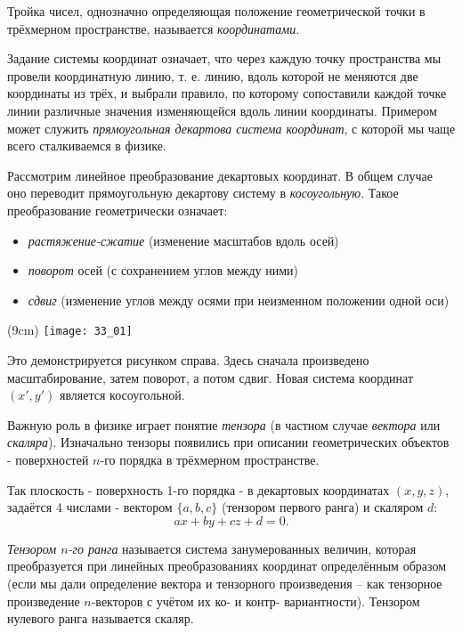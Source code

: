 
Тройка чисел, однозначно определяющая положение геометрической точки в
трёхмерном пространстве, называется \emph{координатами}. 

Задание системы координат означает, что через каждую точку пространства мы
провели координатную линию, т. е. линию, вдоль которой не меняются две
координаты из трёх, и выбрали правило, по которому сопоставили каждой точке
линии различные значения изменяющейся вдоль линии координаты. Примером может
служить \emph{прямоугольная декартова система координат}, с которой мы чаще
всего сталкиваемся в физике.

Рассмотрим линейное преобразование декартовых координат. В общем случае оно
переводит прямоугольную декартову систему в \emph{косоугольную}. Такое
преобразование геометрически означает:
    \begin{itemize}
        \item \emph{растяжение-сжатие} (изменение масштабов вдоль осей)
        \item \emph{поворот} осей (с сохранением углов между ними)
        \item \emph{сдвиг} (изменение углов между осями при неизменном
            положении одной оси)
    \end{itemize}
    
\sidefig(9cm)
{\texttt{[image: 33\_01]}}{Это демонстрируется рисунком справа.
Здесь сначала произведено масштабирование, затем поворот, а потом сдвиг. Новая
система координат \( (x', y') \) является косоугольной.

Важную роль в физике играет понятие \emph{тензора} (в частном случае
\emph{вектора} или \emph{скаляра}). Изначально тензоры появились при описании
геометрических объектов - поверхностей \( n \)-го порядка в трёхмерном
пространстве.
}

Так плоскость - поверхность 1-го порядка - в декартовых координатах
\( (x, y, z) \), задаётся 4 числами - вектором \( \{a,b,c\} \) (тензором
первого ранга) и скаляром \( d \):
\[
    ax+by+cz+d=0.
\]

\emph{Тензором \( n \)-го ранга} называется система занумерованных величин,
которая преобразуется при линейных преобразованиях координат определённым
образом (если мы дали определение вектора и тензорного произведения -- как
тензорное произведение \( n \)-векторов с учётом их ко- и контр- вариантности).
Тензором нулевого ранга называется скаляр.

